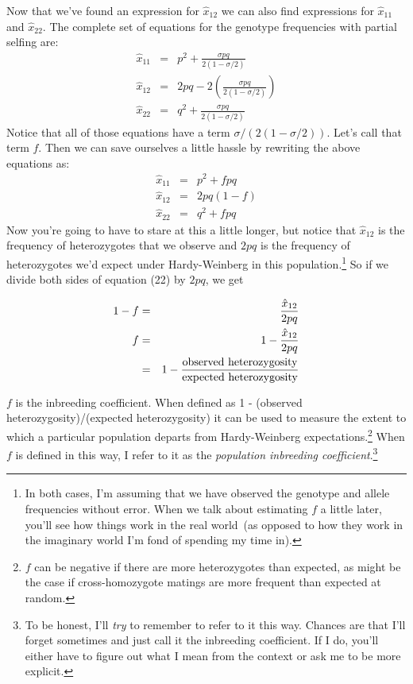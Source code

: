 \documentclass[12pt]{article}
\begin{document}
Now that we've found an expression for $\hat x_{12}$ we can also find
expressions for $\hat x_{11}$ and $\hat x_{22}$. The complete set of
equations for the genotype frequencies with partial selfing are:
\begin{eqnarray}
\hat x_{11} &=& p^2 + \frac{\sigma pq}{2(1-\sigma/2)} \\
\hat x_{12} &=& 2pq - 2\left(\frac{\sigma pq}{2(1-\sigma/2)}\right) \\
\hat x_{22} &=& q^2 + \frac{\sigma pq}{2(1-\sigma/2)} 
\end{eqnarray}
Notice that all of those equations have a term
$\sigma/(2(1-\sigma/2))$. Let's call that term $f$. Then we can save
ourselves a little hassle by rewriting the above equations as:
\begin{eqnarray}
\hat x_{11} &=& p^2 + fpq \\
\hat x_{12} &=& 2pq(1-f) \\
\hat x_{22} &=& q^2 + fpq
\end{eqnarray}
Now you're going to have to stare at this a little longer, but notice
that $\hat x_{12}$ is the frequency of heterozygotes that we observe
and $2pq$ is the frequency of heterozygotes we'd expect under
Hardy-Weinberg in this population.\footnote{In both cases, I'm
  assuming that we have observed the genotype and allele frequencies
  without error. When we talk about estimating $f$ a little later,
  you'll see how things work in the real world~(as opposed to how they
  work in the imaginary world I'm fond of spending my time in).} So if
we divide both sides of equation (22) by $2pq$, we get

\begin{eqnarray}
1-f &=& \frac{\hat x_{12}}{2pq} \\
  f &=& 1 - \frac{\hat x_{12}}{2pq} \\
    &=& 1 - \frac{\hbox{observed heterozygosity}}%
                 {\hbox{expected heterozygosity}}
\end{eqnarray}

$f$ is the inbreeding coefficient. When defined as 1 - (observed
heterozygosity)/(expected heterozygosity) it can be used to measure
the extent to which a particular population departs from
Hardy-Weinberg expectations.\footnote{$f$ can be negative if there are
  more heterozygotes than expected, as might be the case if
  cross-homozygote matings are more frequent than expected at random.}
When $f$ is defined in this way, I refer to it as the {\it population
  inbreeding coefficient}.\footnote{To be honest, I'll {\it try\/} to
  remember to refer to it this way. Chances are that I'll forget
  sometimes and just call it the inbreeding coefficient. If I do,
  you'll either have to figure out what I mean from the context or ask
  me to be more explicit.}
\end{document}
